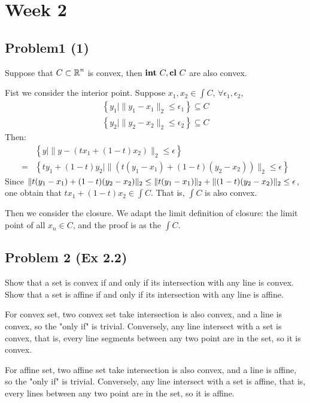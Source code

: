\documentclass[en,hazy,black,12pt,device = normal]{elegantnote}
\begin{document}
\section*{Week 2}
\subsection*{Problem1 (1)}
Suppose that \(C \subset \operatorname{\mathbb R}^n\) is convex, then \({\textbf{int}\ } C, {\textbf{cl}\ } C\) are also convex.

\begin{tcolorbox}
    \sol

    Fist we consider the interior point. Suppose \(x_1,x_2 \in \int C\), \(\forall \epsilon_1,\epsilon_2\),
    \begin{align*}
        \left\{y_1 \mid\|y_1-x_1\|_2 \leq \epsilon_1\right\} \subseteq C\\
        \left\{y_2 \mid\|y_2-x_2\|_2 \leq \epsilon_2\right\} \subseteq C
    \end{align*}
    Then:
    \begin{align*}
        &\left\{y \mid\|y-\left(tx_1+(1-t) x_2\right)\|_2 \leq \epsilon\right\}\\
        =&\left\{ty_1+(1-t)y_2 \mid\|\left(t(y_1 - x_1)+(1-t) (y_2 - x_2)\right)\|_2 \leq \epsilon\right\} 
    \end{align*}
    Since \(\Vert t(y_1 - x_1)+(1-t) (y_2 - x_2) \Vert_2\leq \Vert t(y_1 - x_1) \Vert_2 + \Vert (1-t) (y_2 - x_2) \Vert_2\leq \epsilon\), one obtain that  \(tx_1+(1-t) x_2 \in\int C\). That is, \(\int C\) is also convex.
    
    Then we consider the closure. We adapt the limit definition of closure: the limit point of all \(x_n \in C\), and the proof is as the \(\int C\).
\end{tcolorbox}

\subsection*{Problem 2 (Ex 2.2)}

Show that a set is convex if and only if its intersection with any line is convex. Show that a set is affine if and only if its intersection with any line is affine.

\begin{tcolorbox}
    \sol

    For convex set, two convex set take intersection is also convex, and a line is convex, so the "only if" is trivial. Conversely, any line intersect with a set is convex, that is, every line segments between any two point are in the set, so it is convex.

    For affine set, two affine set take intersection is also convex, and a line is affine, so the "only if" is trivial. Conversely, any line intersect with a set is affine, that is, every lines between any two point are in the set, so it is affine.
\end{tcolorbox}
\end{document}
